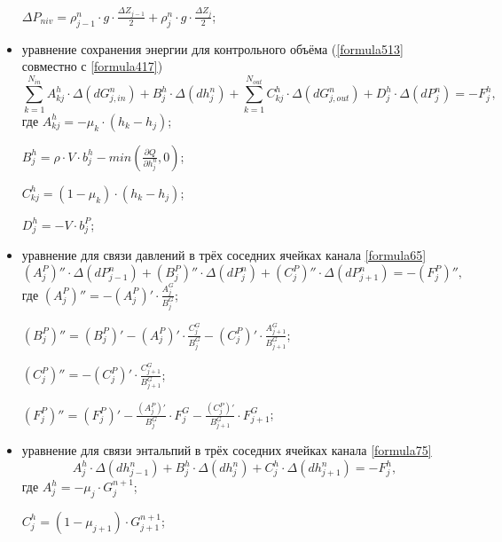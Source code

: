 \begin{itemize}[topsep=5pt, itemsep=-3pt]
\noindent \hspace{0.6cm} $\Delta P_{niv}=\rho_{j-1}^n\cdot g \cdot \frac{\Delta Z_{j-1}}{2}+\rho_{j}^n\cdot g \cdot \frac{\Delta Z_{j}}{2}$;

\item уравнение сохранения энергии для контрольного объёма (\eqref{formula513} совместно с \eqref{formula417})  
$$
\sum_{k=1}^{N_{in}} A_{kj}^h \cdot \Delta(dG_{j,in}^n)+B_j^h \cdot \Delta(dh_j^n) + \sum_{k=1}^{N_{out}} C_{kj}^h \cdot \Delta(dG_{j,out}^n) + D_j^h \cdot \Delta(dP_j^n) = -F_j^h,
$$
где $A_{kj}^h=-\mu_k\cdot (h_k-h_j)$;

\noindent \hspace{0.6cm} $B_j^h=\rho\cdot V\cdot b_j^h - min\left(\frac{\partial Q}{\partial h_j^n},0 \right)$;

\noindent \hspace{0.6cm} $C_{kj}^h=(1-\mu_k)\cdot (h_k-h_j)$;

\noindent \hspace{0.6cm} $D_j^h=-V \cdot b_j^P$; 

\item уравнение для связи давлений в трёх соседних ячейках канала \eqref{formula65}
$$
\left(A_j^P \right)'' \cdot \Delta(dP_{j-1}^n) + \left(B_j^P \right)'' \cdot \Delta(dP_j^n) + \left(C_j^P \right)'' \cdot \Delta(dP_{j+1}^n) = -\left(F_j^P \right)'',
$$
где $\left(A_j^P \right)''=-\left(A_j^P \right)' \cdot \frac{A_j^G}{B_j^G}$;

\noindent \hspace{0.6cm} $\left(B_j^P \right)''=\left(B_j^P \right)'-\left(A_j^P \right)' \cdot \frac{C_j^G}{B_j^G} - \left(C_j^P \right)'\cdot \frac{A_{j+1}^G}{B_{j+1}^G}$;

\noindent \hspace{0.6cm} $\left(C_j^P \right)''=- \left(C_j^P \right)'\cdot \frac{C_{j+1}^G}{B_{j+1}^G}$;

\noindent \hspace{0.6cm} $\left(F_j^P \right)''=\left(F_j^P \right)' - \frac{\left(A_j^P \right)'}{B_j^G}\cdot F_j^G - \frac{\left(C_j^P \right)'}{B_{j+1}^G}\cdot F_{j+1}^G$;

\item уравнение для связи энтальпий в трёх соседних ячейках канала \eqref{formula75}
$$
A_j^h \cdot \Delta(dh_{j-1}^n) + B_j^h \cdot \Delta(dh_j^n) + C_j^h \cdot \Delta(dh_{j+1}^n)  = -F_j^h,
$$
где $A_j^h=- \mu_j \cdot G_j^{n+1}$;

\noindent \hspace{0.6cm} $C_j^h = (1-\mu_{j+1}) \cdot G_{j+1}^{n+1}$;


\end{itemize}
